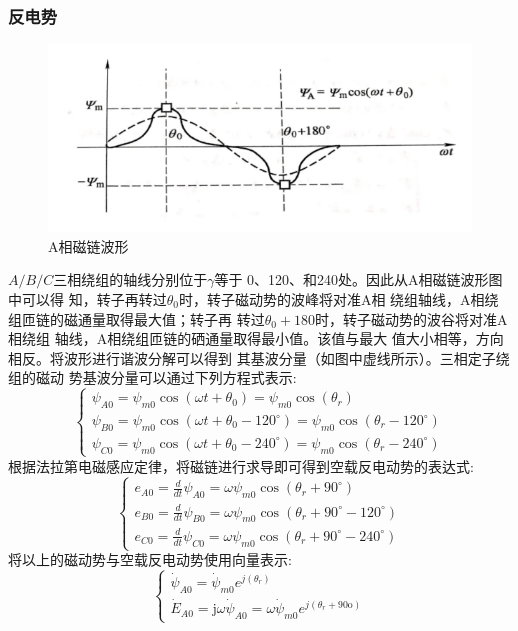 \documentclass{thuemp}
\begin{document}
\subsubsection{反电势}
\begin{figure}[H]
  \centering
  \includegraphics[width=1\linewidth]{./img/task2/flux.png}
  \caption{A相磁链波形}
\end{figure}

$A/B/C$三相绕组的轴线分别位于$\gamma$等于
0、120、和240处。因此从A相磁链波形图中可以得
知，转子再转过$\theta_0$时，转子磁动势的波峰将对准A相
绕组轴线，A相绕组匝链的磁通量取得最大值；转子再
转过$\theta_0 + 180$时，转子磁动势的波谷将对准A相绕组
轴线，A相绕组匝链的硒通量取得最小值。该值与最大
值大小相等，方向相反。将波形进行谐波分解可以得到
其基波分量（如图中虚线所示）。三相定子绕组的磁动
势基波分量可以通过下列方程式表示:
$$\left.\left\{\begin{array}{l}\psi_{A0}=\psi_{m0}\cos\left(\omega t+\theta_0\right)=\psi_{m0}\cos\left(\theta_r\right)\\\psi_{B0}=\psi_{m0}\cos\left(\omega t+\theta_0-120^\circ\right)=\psi_{m0}\cos\left(\theta_r-120^\circ\right)\\\psi_{C0}=\psi_{m0}\cos\left(\omega t+\theta_0-240^\circ\right)=\psi_{m0}\cos\left(\theta_r-240^\circ\right)\end{array}\right.\right.$$
根据法拉第电磁感应定律，将磁链进行求导即可得到空载反电动势的表达式:
$$\left.\left\{\begin{array}{l}e_{A0}=\frac{d}{dt}\psi_{A0}=\omega\psi_{m0}\cos{(\theta_r+90^\circ)}\\e_{B0}=\frac{d}{dt}\psi_{B0}=\omega\psi_{m0}\cos{(\theta_r+90^\circ-120^\circ)}\\e_{C0}=\frac{d}{dt}\psi_{C0}=\omega\psi_{m0}\cos{(\theta_r+90^\circ-240^\circ)}\end{array}\right.\right.$$
将以上的磁动势与空载反电动势使用向量表示:
$$\left.\left\{\begin{array}{l}\dot{\psi}_{A0}=\dot{\psi}_{m0}e^{j(\theta_r)}\\\dot{E}_{A0}=\mathrm{j}\omega\dot{\psi}_{A0}=\omega\dot{\psi}_{m0}e^{j(\theta_r+90\text{o})}\end{array}\right.\right.$$
\end{document}

